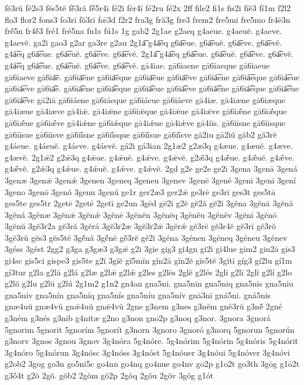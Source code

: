 {fĕ3rŭ
fĕ2s3
fĕs5tĕ
fĕ́3ră
fĕ́5r4ī
fé2i
fér4ī
fé2ru
fé2x
2ff
file2
fi1s
fis2i
fĭĕ3
fí1m
f2l2
flo3
flor2
fons3
fo3rī
fŏ3rī
fœ̄3d
f2r2
fra3g
fră3g
fre3
frem2
fre5mi
fre5mo
fr4ē3n
frḗ5n
fr4ĕ́3
fré1
fré5na
fu1s
fú1s
1g
gab2
2g1ae
g2aeq
g4aeue.
g4aeuĕ.
g4aeve.
g4aevĕ.
ga2i
gao3
g2ar
ga3re
g2au
2g1a͞
g4a͞eq
g6a͞eue.
g6a͞euĕ.
g6a͞eve.
g6a͞evĕ.
g4á͞eq
g6á͞eue.
g6á͞euĕ.
g6á͞eve.
g6á͞evĕ.
2g1a͡
g4a͡eq
g6a͡eue.
g6a͡euĕ.
g6a͡eve.
g6a͡evĕ.
g4á͡eq
g6á͡eue.
g6á͡euĕ.
g6á͡eve.
g6á͡evĕ.
gā4iae.
gā6iaene
gā6iaeque
gā6iaeue
gā6iaeve
gā6ia͞e.
gā6ia͞ene
gā6ia͞eque
gā6ia͞eue
gā6ia͞eve
gā6iá͞ene
gā6iá͞eque
gā6iá͞eue
gā6iá͞eve
gā6ia͡e.
gā6ia͡ene
gā6ia͡eque
gā6ia͡eue
gā6ia͡eve
gā6iá͡ene
gā6iá͡eque
gā6iá͡eue
gā6iá͡eve
gā2iā
gā6iáene
gā6iáeque
gā6iáeue
gā6iáeve
gā4iæ.
gā4iæne
gā6iæque
gā4iæue
gā4iæve
gā4iǣ.
gā4iǣne
gā6iǣque
gā4iǣue
gā4iǣve
gā6iǣ́ne
gā6iǣ́que
gā6iǣ́ue
gā6iǣ́ve
gā4iǽne
gā6iǽque
gā4iǽue
gā4iǽve
gā4iīs.
gā6iīsne
gā6iīsque
gā6iīsue
gā6iīsve
gā6iī́sne
gā6iī́sque
gā6iī́sue
gā6iī́sve
gā2iu
gā2iú
găb2
gă3rĕ
g4áeue.
g4áeuĕ.
g4áeve.
g4áevĕ.
gá2i
gá3ian
2g1æ2
g2æ3q
g4æue.
g4æuĕ.
g4æve.
g4ævĕ.
2g1ǣ2
g2ǣ3q
g4ǣue.
g4ǣuĕ.
g4ǣve.
g4ǣvĕ.
g2ǣ́3q
g4ǣ́ue.
g4ǣ́uĕ.
g4ǣ́ve.
g4ǣ́vĕ.
g2ǽ3q
g4ǽue.
g4ǽuĕ.
g4ǽve.
g4ǽvĕ.
2gd
g2e
ge2e
ge2i
3gena
3genā
3gená
3genæ
3genǣ
3genǽ
3genen
3geneq
3geneu
3genev
3genē
3gené
3geni
3genī
3gení
3geno
3genō
3genó
3genu
3genú
ge1r
ger2æ3
ger2ǣ
ge3rē
ge3rī
ges3t
ges5tā
ges5te
ges5tr
2getē
2geté
2getī
ge2un
3gēd
gē2i
g2ĕ
gĕ2ă
gĕ2ī
3gĕna
3gĕnā
3gĕnă
3gĕná
3gĕnæ
3gĕnǣ
3gĕnǽ
3gĕnē
3gĕnĕn
3gĕnĕq
3gĕnĕu
3gĕnĕv
3gĕnī
3gĕnō
3gĕnŭ
3gĕ3r2a
gĕ3ră
3gĕrá
3gĕ3r2æ
3gĕ3r2ǣ
3gĕrǽ
gĕ3rē
gĕ3r4ĕ
gĕ3rī
gĕ3rŏ
3gĕ3rŭ
gĕs3
gĕs5tĕ
3gĕ́nă
3gĕ́nĕ
gĕ́3rĕ
gé2i
3géna
3génen
3géneq
3géneu
3génev
3géss
3gést
2gg2
g3ga
g3gæ3
g3gǣ
g2i
3gie
gig3
gi4gn
gi2i
gi4lue
gim2
gin2ā
gis3
gi4sc
gis5ci
gispe3
gis5te
g2ĭ
3gĭĕ
gĭ5mĭn
gĭn2ā
gĭn2ĕ
gĭs5tĕ
3gĭtī
gíg3
gí2lu
gí1m
gí3tur
g2la
g2lā
g2lá
g2læ
g2lǣ
g2lǽ
g2les
g2lēs
2glĕ
g2lés
2gli
g2lī
2glĭ
g2lí
g2lo
g2lŏ
g2lu
g2lū
g2lú
2g1m2
g1n2
gn4an
gna5ni.
gna5nin
gna5niq
gna5nis
gna5niu
gna5niv
gna5nín
gna5níq
gna5nís
gna5níu
gna5nív
gnā3nī
gná5ni.
gná5nis
gnæ4uŭ
gnæ4vŭ
gnǣ4uŭ
gnǣ4vŭ
2gne
g3nem
g3nes
g3nĕm
gnĕ3rŭ
g3nĕ́
2gné
g3ném
g3nés
g3nib
g4nitæ
g2no
g3non
gno2p
g3noq
g3nor.
3gnora
3gnorá
5gnorim
5gnorit
5gnorím
5gnorít
g3norn
3gnoro
3gnoró
g3norq
5gnorun
5gnorún
g3norv
3gnos
3gnou
3gnov
3g4nóra
5g4nóre.
5g4nórim
5g4nórin
5g4nóris
5g4nórit
3g4nóro
5g4nórun
3g4nósc
3g4nóss
3g4nóst
5g4nóuer
3g4nóui
5g4nóver
3g4nóvi
g2ob2
3gog
go3n
go5ni5c
go4nn
go4nq
go4nue
go4nv
go2p
g1o2t
go3th
3gōg
g1ō2t
g3ṓ4t
g2ŏ
2gŏ.
gŏb2
2gŏm
gŏ2p
2gŏq
2gŏu
2gŏv
3góg
g1ót
}
